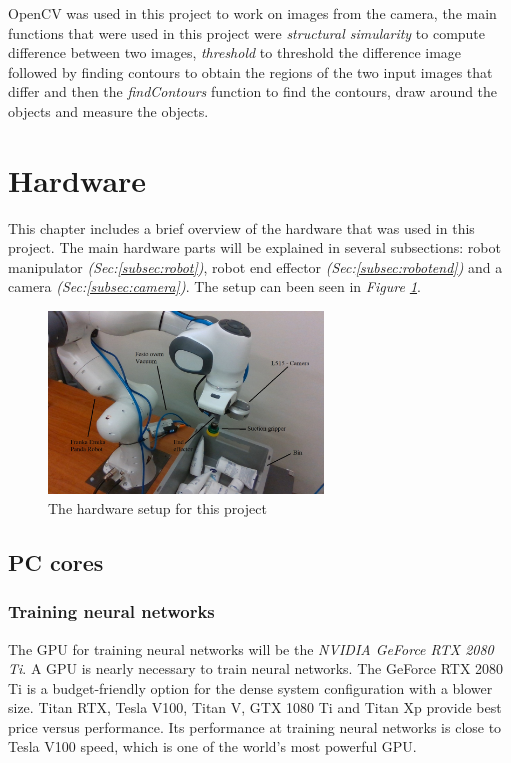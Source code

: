 OpenCV was used in this project to work on images from the camera, the main functions that were used in this project were \textit{structural simularity} to compute difference between two images,  \textit{threshold} to threshold the difference image followed by finding contours to obtain the regions of the two input images that differ and then the \textit{findContours} function to find the contours, draw around the objects and measure the objects.

\clearpage
\section{Hardware \label{sec:hardware}}
This chapter includes a brief overview of the hardware that was used in this project. The main hardware parts will be explained in several subsections: robot manipulator \textit{(Sec:\ref{subsec:robot})}, robot end effector \textit{(Sec:\ref{subsec:robotend})} and a camera \textit{(Sec:\ref{subsec:camera})}. The setup can been seen in \textit{Figure \ref{fig:setupproject}}.

\begin{figure}[h]
    \centering
    \includegraphics[width = 0.65\textwidth]{graphics/setup.jpg}
    \caption{The hardware setup for this project}
    \label{fig:setupproject}
\end{figure}

\subsection{PC cores}
\vspace{0.5cm}

\subsubsection*{Training neural networks}
The GPU for training neural networks will be the \textit{NVIDIA GeForce RTX 2080 Ti}\cite{noauthor_graphics_nodate}.
A GPU is nearly necessary to train neural networks. The GeForce RTX 2080 Ti is a budget-friendly option for the dense system configuration with a blower size. Titan RTX, Tesla V100, Titan V, GTX 1080 Ti and Titan Xp provide best price versus performance. Its performance at training neural networks is close to Tesla V100 speed, which is one of the world's most powerful GPU\cite{noauthor_deep_2018}. 

